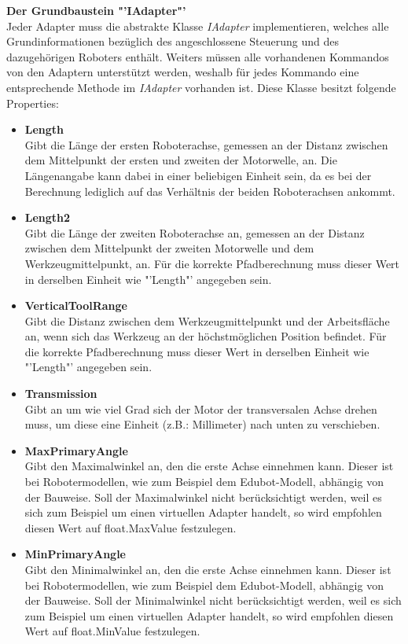 \textbf{Der Grundbaustein "'IAdapter"'}\\
Jeder Adapter muss die abstrakte Klasse \textit{IAdapter} implementieren, welches alle Grundinformationen bezüglich des angeschlossene Steuerung und des dazugehörigen Roboters enthält. Weiters müssen alle vorhandenen Kommandos von den Adaptern unterstützt werden, weshalb für jedes Kommando eine entsprechende Methode im \textit{IAdapter} vorhanden ist. Diese Klasse besitzt folgende Properties:
\begin{itemize}
\item \textbf{Length}\\
Gibt die Länge der ersten Roboterachse, gemessen an der Distanz zwischen dem Mittelpunkt der ersten und zweiten der Motorwelle, an. Die Längenangabe kann dabei in einer beliebigen Einheit sein, da es bei der Berechnung lediglich auf das Verhältnis der beiden Roboterachsen ankommt.
\item \textbf{Length2}\\
Gibt die Länge der zweiten Roboterachse an, gemessen an der Distanz zwischen dem Mittelpunkt der zweiten Motorwelle und dem Werkzeugmittelpunkt, an. Für die korrekte Pfadberechnung muss dieser Wert in derselben Einheit wie "'Length"' angegeben sein.
\item \textbf{VerticalToolRange}\\
Gibt die Distanz zwischen dem Werkzeugmittelpunkt und der Arbeitsfläche an, wenn sich das Werkzeug an der höchstmöglichen Position befindet. Für die korrekte Pfadberechnung muss dieser Wert in derselben Einheit wie "'Length"' angegeben sein.
\item \textbf{Transmission}\\
Gibt an um wie viel Grad sich der Motor der transversalen Achse drehen muss, um diese eine Einheit (z.B.: Millimeter) nach unten zu verschieben.
\item \textbf{MaxPrimaryAngle}\\
Gibt den Maximalwinkel an, den die erste Achse einnehmen kann. Dieser ist bei Robotermodellen, wie zum Beispiel dem Edubot-Modell, abhängig von der Bauweise. Soll der Maximalwinkel nicht berücksichtigt werden, weil es sich zum Beispiel um einen virtuellen Adapter handelt, so wird empfohlen diesen Wert auf float.MaxValue festzulegen.
\item \textbf{MinPrimaryAngle}\\
Gibt den Minimalwinkel an, den die erste Achse einnehmen kann. Dieser ist bei Robotermodellen, wie zum Beispiel dem Edubot-Modell, abhängig von der Bauweise. Soll der Minimalwinkel nicht berücksichtigt werden, weil es sich zum Beispiel um einen virtuellen Adapter handelt, so wird empfohlen diesen Wert auf float.MinValue festzulegen.

\end{itemize}
